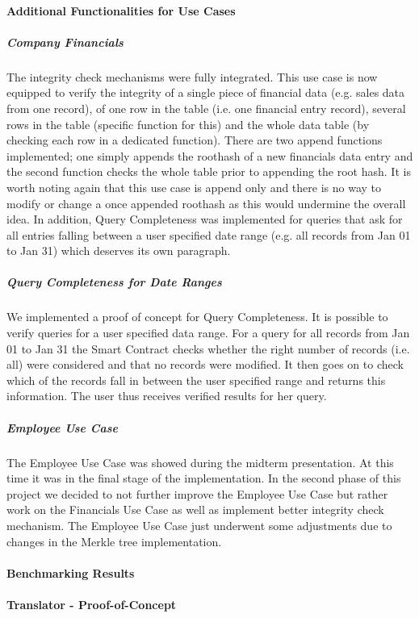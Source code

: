 \paragraph{Additional Functionalities for Use Cases}
\subparagraph{Company Financials}
The integrity check mechanisms were fully integrated. This use case is now equipped to verify the integrity of a single piece of financial data (e.g. sales data from one record), of one row in the table (i.e. one financial entry record), several rows in the table (specific function for this) and the whole data table (by checking each row in a dedicated function).
There are two append functions implemented; one simply appends the roothash of a new financials data entry and the second function checks the whole table prior to appending the root hash. It is worth noting again that this use case is append only and there is no way to modify or change a once appended roothash as this would undermine the overall idea.
In addition, Query Completeness was implemented for queries that ask for all entries falling between a user specified date range (e.g. all records from Jan 01 to Jan 31) which deserves its own paragraph.

\subparagraph{Query Completeness for Date Ranges}
We implemented a proof of concept for Query Completeness. It is possible to verify queries for a user specified data range. For a query for all records from Jan 01 to Jan 31 the Smart Contract checks whether the right number of records (i.e. all) were considered and that no records were modified. It then goes on to check which of the records fall in between the user specified range and returns this information. The user thus receives verified results for her query.

\subparagraph{Employee Use Case}
The Employee Use Case was showed during the midterm presentation. At this time it was in the final stage of the implementation. In the second phase of this project we decided to not further improve the Employee Use Case but rather work on the Financials Use Case as well as implement better integrity check mechanism. The Employee Use Case just underwent some adjustments due to changes in the Merkle tree implementation.

\paragraph{Benchmarking Results}

\paragraph{Translator - Proof-of-Concept}

